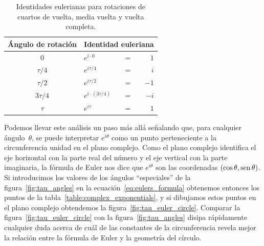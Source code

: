\begin{table}
\begin{center}
\begin{tabular}{cllr}
Ángulo de rotación & \multicolumn{3}{c}{Identidad euleriana} \\ \hline
$0$ & $e^{i\cdot0}$ & $ = $ & $1$ \smallskip \\
$\tau/4$ & $e^{i\tau/4}$ & $ = $ & $i$ \smallskip \\
$\tau/2$ & $e^{i\tau/2}$ & $ = $ & $-1$ \smallskip \\
$3\tau/4$ & $e^{i\cdot(3\tau/4)}$ & $ = $ & $-i$ \smallskip \\
$\tau$ & $e^{i\tau}$ & $ = $ & $1$
\end{tabular}
\end{center}
\caption{Identidades eulerianas para rotaciones de cuartos de vuelta, media vuelta y vuelta completa.\label{table:eulerian_identities}}
\end{table}


Podemos llevar este análisis un paso más allá señalando que, para cualquier ángulo~$\theta$, se puede interpretar $e^{i\theta}$ como un punto perteneciente a la circunferencia unidad en el plano complejo. Como el plano complejo identifica el eje horizontal con la parte real del número y el eje vertical con la parte imaginaria, la fórmula de Euler nos dice que $e^{i\theta}$ son las coordenadas $(\cos\theta, \mbox{sen}\,\theta)$. Si introducimos los valores de los ángulos ``especiales'' de la figura~\ref{fig:tau_angles} en la ecuación~\eqref{eq:eulers_formula} obtenemos entonces los puntos de la tabla~\ref{table:complex_exponentials}, y si dibujamos estos puntos en el plano complejo obtendemos la figura~\ref{fig:tau_euler_circle}. Comparar la figura~\ref{fig:tau_euler_circle} con la figura~\ref{fig:tau_angles} disipa rápidamente cualquier duda acerca de cuál de las constantes de la circunferencia revela mejor la relación entre la fórmula de Euler y la geometría del círculo.

